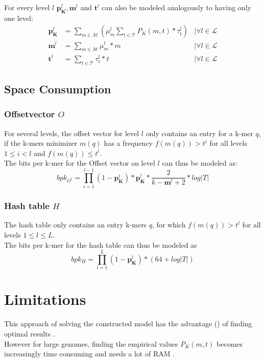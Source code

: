 \documentclass{article}
\newcommand{\percKmers}{\textbf{p}_\textbf{K}}
\newcommand{\percKmersEmpiric}{P_{K}}
\newcommand{\possibleMinimizerLength}{\mathcal{M}}
\newcommand{\possibleThresholds}{\mathcal{T}}
\newcommand{\minimizerLength}{\textbf{m}}
\newcommand{\threshold}{\textbf{t}}
\newcommand{\selectorm}{\mu}
\newcommand{\selectort}{\tau}
\newcommand{\levels}{\mathcal{L}}
\begin{document}
For every level $l$ $\percKmers^l, \minimizerLength^l$ and $\threshold^l$ can also be modeled analogously to having only one level: 
\begin{align*}
	\percKmers^l &= \sum_{m \in \possibleMinimizerLength} \left( \selectorm_m^l \sum_{t \in \possibleThresholds} \percKmersEmpiric(m, t) * \selectort_t^l\right) & \mid \forall l \in \levels\\
	\minimizerLength^l &= \sum_{m \in \possibleMinimizerLength} \selectorm_m^l * m  & \mid \forall l \in \levels\\
	\threshold^l &= \sum_{t \in \possibleThresholds} \selectort_t^l * t & \mid \forall l \in \levels
\end{align*}


\subsection*{Space Consumption}
\subsubsection*{Offsetvector $O$}
For several levels, the offset vector for level $l$ only contains an entry for a k-mer $q$, if the k-mers minimizer $m(q)$ has a frequency $f(m(q)) > t^{i}$ for all levels $1 \leq i < l$ and $f(m(q)) \leq t^{l}$. \\
The bits per k-mer for the Offset vector on level $l$ can thus be modeled as:
\[bpk_{O^l} = \prod_{i=1}^{l-1} (1-\percKmers^i) * \percKmers^l * \frac{2}{k-\minimizerLength^l+2} * log |T| \]

\subsubsection*{Hash table $H$}
The hash table only contains an entry k-mers $q$, for which $f(m(q)) > t^l$ for all levels $1 \leq l \leq L$.\\
The bits per k-mer for the hash table can thus be modeled as 
\[ bpk_H = \prod_{l=1}^{L} (1-\percKmers^l) * (64 + log|T|)\]

\newpage
\section{Limitations}
This approach of solving the constructed model has the advantage () of finding optimal results .\\
However for large genomes, finding the empirical values $\percKmersEmpiric(m,t)$ becomes increasingly time consuming and needs a lot of RAM .\\
\end{document}
